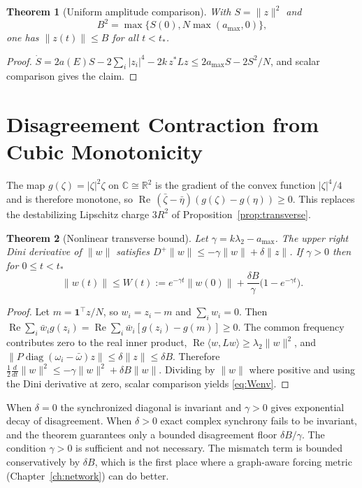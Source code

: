 \documentclass[11pt,notitlepage]{report}
\newtheorem{theorem}{Theorem}[chapter]
\theoremstyle{definition}
\theoremstyle{remark}
\newcommand{\R}{\mathbb R}
\newcommand{\C}{\mathbb C}
\newcommand{\re}{\operatorname{Re}}
\newcommand{\one}{\mathbf 1}
\begin{document}
\begin{theorem}[Uniform amplitude comparison]\label{th:amp}
With $S=\|z\|^2$ and
\[B^2=\max\{S(0),N\max(a_{\max},0)\},\]
one has $\|z(t)\|\le B$ for all $t<t_*$.
\end{theorem}
\begin{proof}
$\dot S=2a(E)S-2\sum_i|z_i|^4-2k\,z^*Lz\le2a_{\max}S-2S^2/N$, and scalar comparison gives the claim.
\end{proof}

\section{Disagreement Contraction from Cubic Monotonicity}
The map $g(\zeta)=|\zeta|^2\zeta$ on $\C\cong\R^2$ is the gradient of the convex function $|\zeta|^4/4$ and is therefore monotone, so $\re\,(\bar\zeta-\bar\eta)(g(\zeta)-g(\eta))\ge0$. This replaces the destabilizing Lipschitz charge $3R^2$ of Proposition~\ref{prop:transverse}.
\begin{theorem}[Nonlinear transverse bound]\label{th:trans}
Let $\gamma=k\lambda_2-a_{\max}$. The upper right Dini derivative of $\|w\|$ satisfies $D^+\|w\|\le-\gamma\|w\|+\delta\|z\|$. If $\gamma>0$ then for $0\le t<t_*$
\begin{equation}\label{eq:Wenv}
\|w(t)\|\le W(t):=e^{-\gamma t}\|w(0)\|+\frac{\delta B}{\gamma}\bigl(1-e^{-\gamma t}\bigr).
\end{equation}
\end{theorem}
\begin{proof}
Let $m=\one^\top z/N$, so $w_i=z_i-m$ and $\sum_iw_i=0$. Then $\re\sum_i\bar w_ig(z_i)=\re\sum_i\bar w_i[g(z_i)-g(m)]\ge0$. The common frequency contributes zero to the real inner product, $\re\langle w,Lw\rangle\ge\lambda_2\|w\|^2$, and $\|P\operatorname{diag}(\omega_i-\bar\omega)z\|\le\delta\|z\|\le\delta B$. Therefore $\tfrac12\tfrac d{dt}\|w\|^2\le-\gamma\|w\|^2+\delta B\|w\|$. Dividing by $\|w\|$ where positive and using the Dini derivative at zero, scalar comparison yields \eqref{eq:Wenv}.
\end{proof}
When $\delta=0$ the synchronized diagonal is invariant and $\gamma>0$ gives exponential decay of disagreement. When $\delta>0$ exact complex synchrony fails to be invariant, and the theorem guarantees only a bounded disagreement floor $\delta B/\gamma$. The condition $\gamma>0$ is sufficient and not necessary. The mismatch term is bounded conservatively by $\delta B$, which is the first place where a graph-aware forcing metric (Chapter~\ref{ch:network}) can do better.
\end{document}
